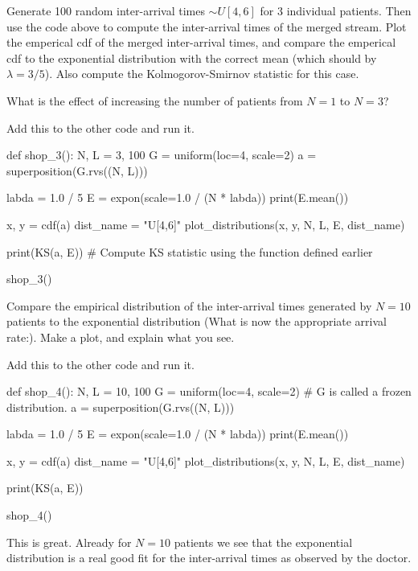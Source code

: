 \begin{exercise}
  Generate 100 random inter-arrival times $\sim U[4,6]$ for 3 individual patients.
  Then use the code above to compute the inter-arrival times of the merged stream.
  Plot the emperical cdf of the merged inter-arrival times, and compare the emperical cdf to the exponential distribution with the correct mean (which should by $\lambda = 3/5$).
  Also compute the Kolmogorov-Smirnov statistic for this case.

  What is the effect of increasing the number of patients from $N=1$ to $N=3$?
\begin{solution}
Add this to the other code and run it.
\begin{pyverbatim}
def shop_3():
    N, L = 3, 100
    G = uniform(loc=4, scale=2)
    a = superposition(G.rvs((N, L)))

    labda = 1.0 / 5
    E = expon(scale=1.0 / (N * labda))
    print(E.mean())

    x, y = cdf(a)
    dist_name = "U[4,6]"
    plot_distributions(x, y, N, L, E, dist_name)

    print(KS(a, E))  # Compute KS statistic using the function defined earlier


shop_3()
\end{pyverbatim}

\end{solution}
\end{exercise}


\begin{exercise}
  Compare the empirical distribution of the inter-arrival times generated by $N=10$ patients to the exponential distribution (What is now the appropriate arrival rate:).
  Make a plot, and explain what you see.
\begin{solution}
Add this to the other code and run it.
\begin{pyverbatim}
def shop_4():
    N, L = 10, 100
    G = uniform(loc=4, scale=2)  # G is called a frozen distribution.
    a = superposition(G.rvs((N, L)))

    labda = 1.0 / 5
    E = expon(scale=1.0 / (N * labda))
    print(E.mean())

    x, y = cdf(a)
    dist_name = "U[4,6]"
    plot_distributions(x, y, N, L, E, dist_name)

    print(KS(a, E))


shop_4()
\end{pyverbatim}

This is great.
Already for $N=10$ patients we see that the exponential distribution is a real good fit for the inter-arrival times as observed by the doctor.
\end{solution}
\end{exercise}



